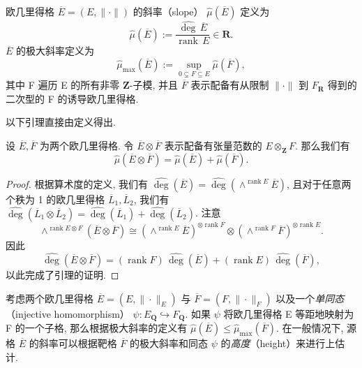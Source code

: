 \begin{definition}\label{def:7.2.6}
欧几里得格 \(\overline{E} = (E, \|\cdot\|)\) 的斜率（slope） \(\widehat{\mu}(\overline{E})\) 定义为
\[ \widehat{\mu}(\overline{E}) := \frac{\widehat{\operatorname{deg}}\,\overline{E}}{\operatorname{rank}\,E} \in \mathbf{R}. \]
\(\overline{E}\) 的极大斜率定义为
\[ \widehat{\mu}_{\max}(\overline{E}) := \sup_{0 \subsetneq F \subseteq E} \widehat{\mu}(\overline{F}), \]
其中 F 遍历 E 的所有非零 \(\mathbf{Z}\)-子模, 
并且 \(\overline{F}\) 表示配备有从限制 \(\|\cdot\|\) 到 \(F_{\mathbf{R}}\) 得到的二次型的 F 的诱导欧几里得格.
\end{definition}

以下引理直接由定义得出.

\begin{lemma}\label{lem:7.2.7}
设 \(\overline{E}, \overline{F}\) 为两个欧几里得格. 
令 \(\overline{E} \otimes \overline{F}\) 表示配备有张量范数的 \(E \otimes_{\mathbf{Z}} F\). 
那么我们有
\[ \widehat{\mu}(\overline{E} \otimes \overline{F}) = \widehat{\mu}(\overline{E}) + \widehat{\mu}(\overline{F}). \]
\end{lemma}

\begin{proof}
根据算术度的定义, 我们有 \(\widehat{\operatorname{deg}}(\overline{E}) = \widehat{\operatorname{deg}}(\wedge^{\operatorname{rank} E}\overline{E})\), 
且对于任意两个秩为 1 的欧几里得格 \(\overline{L}_1, \overline{L}_2\), 
我们有 \(\widehat{\operatorname{deg}}(\overline{L}_1 \otimes \overline{L}_2) = \widehat{\operatorname{deg}}(\overline{L}_1) + \widehat{\operatorname{deg}}(\overline{L}_2)\). 
注意
\[ \wedge^{\operatorname{rank} E \otimes F}(\overline{E} \otimes \overline{F}) \cong (\wedge^{\operatorname{rank} E} \overline{E})^{\otimes \operatorname{rank} F} \otimes (\wedge^{\operatorname{rank} F} \overline{F})^{\otimes \operatorname{rank} E}. \]
因此
\[ \widehat{\operatorname{deg}}\left(\overline{E}\otimes\overline{F}\right)=(\operatorname{rank}F)\,\widehat{\operatorname{deg}}\left(\overline{E}\right)+(\operatorname{rank}E)\,\widehat{\operatorname{deg}}\left(\overline{F}\right), \]
以此完成了引理的证明.
\end{proof}

考虑两个欧几里得格 \(\overline{E} = (E, \|\cdot\|_E)\) 与 \(\overline{F} = (F, \|\cdot\|_F)\) 以及一个\emph{单同态}（injective homomorphism） \(\psi : E_{\mathbf{Q}} \hookrightarrow F_{\mathbf{Q}}\). 
如果 \(\psi\) 将欧几里得格 E 等距地映射为 F 的一个子格, 
那么根据极大斜率的定义有 \(\widehat{\mu}(\overline{E}) \leq \widehat{\mu}_{\max}(\overline{F})\). 
在一般情况下, 源格 \(\overline{E}\) 的斜率可以根据靶格 \(\overline{F}\) 的极大斜率和同态 \(\psi\) 的\emph{高度}（height）来进行上估计.

